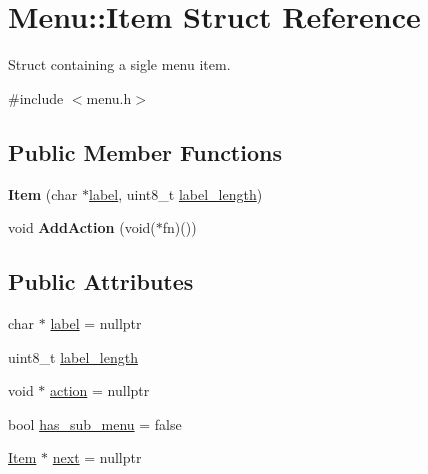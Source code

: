 \hypertarget{struct_menu_1_1_item}{}\section{Menu\+:\+:Item Struct Reference}
\label{struct_menu_1_1_item}


Struct containing a sigle menu item.  




{\ttfamily \#include $<$menu.\+h$>$}

\subsection*{Public Member Functions}
\begin{DoxyCompactItemize}
\item 
\hypertarget{struct_menu_1_1_item_ad87fb2f4d51e4c095b93af5ea4bd2275}{}\label{struct_menu_1_1_item_ad87fb2f4d51e4c095b93af5ea4bd2275} 
{\bfseries Item} (char $\ast$\hyperlink{struct_menu_1_1_item_a378723382fc64c752a85ffe6fec9707e}{label}, uint8\+\_\+t \hyperlink{struct_menu_1_1_item_a46749d046bbbde8d5308848d5394c2dc}{label\+\_\+length})
\item 
\hypertarget{struct_menu_1_1_item_a9ae75532a76e0fdf4e9c22727280f029}{}\label{struct_menu_1_1_item_a9ae75532a76e0fdf4e9c22727280f029} 
void {\bfseries Add\+Action} (void($\ast$fn)())
\end{DoxyCompactItemize}
\subsection*{Public Attributes}
\begin{DoxyCompactItemize}
\item 
char $\ast$ \hyperlink{struct_menu_1_1_item_a378723382fc64c752a85ffe6fec9707e}{label} = nullptr
\item 
uint8\+\_\+t \hyperlink{struct_menu_1_1_item_a46749d046bbbde8d5308848d5394c2dc}{label\+\_\+length}
\item 
void $\ast$ \hyperlink{struct_menu_1_1_item_a247e140fed2addf80986ba5a3506b9dd}{action} = nullptr
\item 
bool \hyperlink{struct_menu_1_1_item_a5c9895a137458b9a12dafd447ac7430b}{has\+\_\+sub\+\_\+menu} = false
\item 
\hyperlink{struct_menu_1_1_item}{Item} $\ast$ \hyperlink{struct_menu_1_1_item_aadcc1e4e824296c6b72ac7d053f06869}{next} = nullptr
\end{DoxyCompactItemize}


